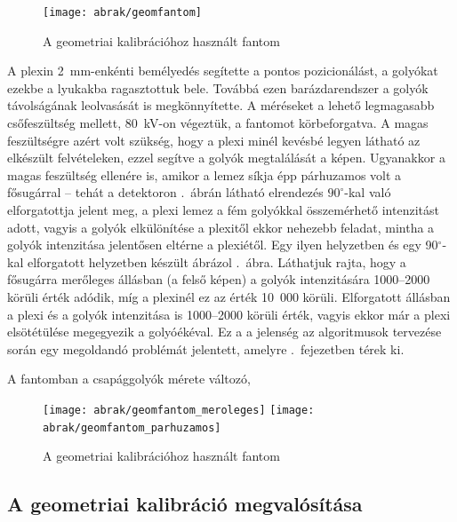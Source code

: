 \documentclass[a4paper,12pt]{article}
\begin{document}
\begin{figure}[htbp]
\center
\texttt{[image: abrak/geomfantom]}
\caption{A geometriai kalibrációhoz használt fantom}
\label{fig:geomfantom}
\end{figure}


 A plexin 2~mm-enkénti bemélyedés segítette a pontos pozicionálást, a golyókat ezekbe a lyukakba ragasztottuk bele. Továbbá ezen barázdarendszer a golyók távolságának leolvasását is megkönnyítette. A méréseket a lehető legmagasabb csőfeszültség mellett, 80~kV-on végeztük, a fantomot körbeforgatva. A magas feszültségre azért volt szükség, hogy a plexi minél kevésbé legyen látható az elkészült felvételeken, ezzel segítve a golyók megtalálását a képen. Ugyanakkor a magas feszültség ellenére is, amikor a lemez síkja épp párhuzamos volt a fősugárral -- tehát a detektoron .~ábrán látható elrendezés $90^\circ$-kal való elforgatottja jelent meg, a plexi lemez a fém golyókkal összemérhető intenzitást adott, vagyis a golyók elkülönítése a plexitől ekkor nehezebb feladat, mintha a golyók intenzitása jelentősen eltérne a plexiétől. Egy ilyen helyzetben és egy 90$^\circ$-kal elforgatott helyzetben készült ábrázol .~ábra. Láthatjuk rajta, hogy a fősugárra merőleges állásban (a felső képen) a golyók intenzitására 1000--2000 körüli érték adódik, míg a plexinél ez az érték 10~000 körüli. Elforgatott állásban a plexi és a golyók intenzitása is 1000--2000 körüli érték, vagyis ekkor már a plexi elsötétülése megegyezik a golyóékéval. Ez a a jelenség az algoritmusok tervezése során egy megoldandó problémát jelentett, amelyre .~fejezetben térek ki. 
 
A fantomban a csapággolyók mérete változó, 






\begin{figure}[htbp]
\center
\texttt{[image: abrak/geomfantom\_meroleges]}
\texttt{[image: abrak/geomfantom\_parhuzamos]}
\caption{A geometriai kalibrációhoz használt fantom}
\label{fig:geomfantom_plexi}
\end{figure}







\subsection{A geometriai kalibráció megvalósítása}
\end{document}
